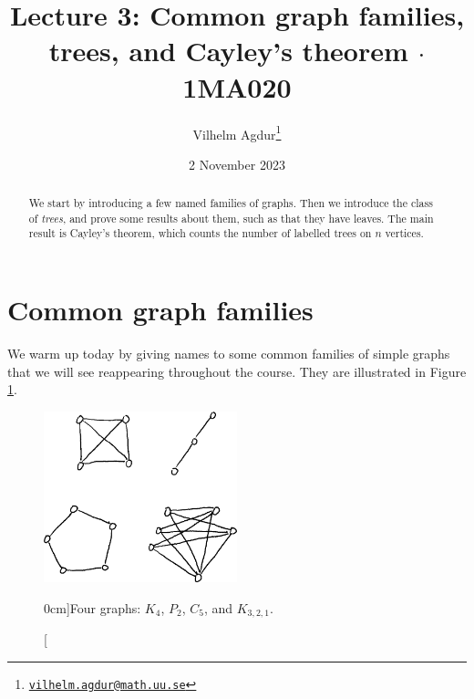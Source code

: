 \documentclass[nobib]{tufte-handout}
\title{Lecture 3: Common graph families, trees, and Cayley's theorem $\cdot$ 1MA020}
\author[Vilhelm Agdur]{Vilhelm Agdur\thanks{\href{mailto:vilhelm.agdur@math.uu.se}{\nolinkurl{vilhelm.agdur@math.uu.se}}}}
\date{2 November 2023}
\begin{document}
\maketitle%

\begin{abstract}
\noindent
We start by introducing a few named families of graphs. Then we introduce the class of \emph{trees}, and prove some results about them, such as that they have leaves. The main result is Cayley's theorem, which counts the number of labelled trees on $n$ vertices.
\end{abstract}

\section{Common graph families}

We warm up today by giving names to some common families of simple graphs that we will see reappearing throughout the course. They are illustrated in Figure \ref{fig:graph_families}.

\begin{figure}
  \centering
  \includegraphics[width=0.5\textwidth]{graphics/L3_trees/graph_families.png}
  \caption[][0cm]{Four graphs: $K_4$, $P_2$, $C_5$, and $K_{3,2,1}$.}
  \label{fig:graph_families}
\end{figure}
\end{document}
